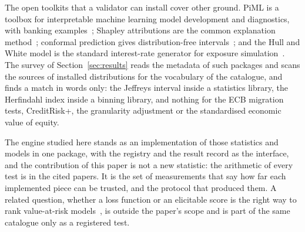 The open toolkits that a validator can install cover other ground. PiML is a toolbox for interpretable machine learning model development and diagnostics, with banking examples~\citep{sudjianto2023}; Shapley attributions are the common explanation method~\citep{lundberg2017}; conformal prediction gives distribution-free intervals~\citep{angelopoulos2023}; and the Hull and White model is the standard interest-rate generator for exposure simulation~\citep{hull1990}. The survey of Section~\ref{sec:results} reads the metadata of \pypiFound{} such packages and scans the sources of \distScanned{} installed distributions for the vocabulary of the catalogue, and finds a match in words only: the Jeffreys interval inside a statistics library, the Herfindahl index inside a binning library, and nothing for the ECB migration tests, CreditRisk+, the granularity adjustment or the standardised economic value of equity.

The engine studied here stands as an implementation of those statistics and models in one package, with the registry and the result record as the interface, and the contribution of this paper is not a new statistic: the arithmetic of every test is in the cited papers. It is the set of measurements that say how far each implemented piece can be trusted, and the protocol that produced them. A related question, whether a loss function or an elicitable score is the right way to rank value-at-risk models~\citep{fissler2016}, is outside the paper's scope and is part of the same catalogue only as a registered test.
